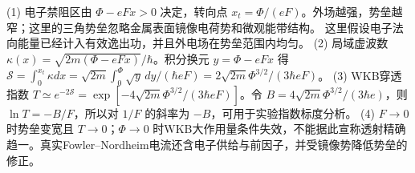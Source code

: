 (1) 电子禁阻区由 \(\Phi-eFx>0\) 决定，转向点 \(x_t=\Phi/(eF)\)。外场越强，势垒越窄；这里的三角势垒忽略金属表面镜像电荷势和微观能带结构。 这里假设电子法向能量已经计入有效逸出功，并且外电场在势垒范围内均匀。
(2) 局域虚波数 \(\kappa(x)=\sqrt{2m(\Phi-eFx)}/\hbar\)。积分换元 \(y=\Phi-eFx\) 得 \(\mathcal S=\int_0^{x_t}\kappa dx=\sqrt{2m}\int_0^\Phi\sqrt y\,dy/(\hbar eF)=2\sqrt{2m}\Phi^{3/2}/(3\hbar eF)\)。
(3) WKB穿透指数 \(T\simeq e^{-2\mathcal S}=\exp[-4\sqrt{2m}\Phi^{3/2}/(3\hbar eF)]\)。令 \(B=4\sqrt{2m}\Phi^{3/2}/(3\hbar e)\)，则 \(\ln T=-B/F\)，所以对 \(1/F\) 的斜率为 \(-B\)，可用于实验指数标度分析。
(4) \(F\to0\) 时势垒变宽且 \(T\to0\)；\(\Phi\to0\) 时WKB大作用量条件失效，不能据此宣称透射精确趋一。真实Fowler--Nordheim电流还含电子供给与前因子，并受镜像势降低势垒的修正。
